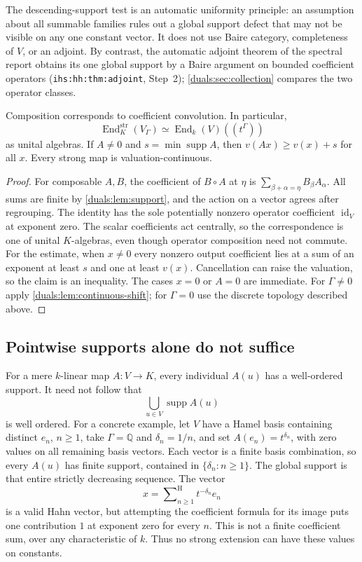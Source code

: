 \documentclass[11pt,letterpaper]{article}
\numberwithin{equation}{section}
\theoremstyle{definition}
\theoremstyle{remark}
\newcommand{\Q}{\mathbb Q}
\newcommand{\supp}{\operatorname{supp}}
\newcommand{\End}{\operatorname{End}}
\newcommand{\sH}{\mathop{\sum}\nolimits^{\mathrm H}}
\newcommand{\ihs}[1]{\texttt{ihs:#1}}
\begin{document}
The descending-support test is an automatic uniformity principle: an
assumption about all summable families rules out a global support defect
that may not be visible on any one constant vector. It does not use
Baire category, completeness of $V$, or an adjoint. By contrast, the
automatic adjoint theorem of the spectral report obtains its one global
support by a Baire argument on bounded coefficient operators
(\ihs{hh:thm:adjoint}, Step~2); \cref{duals:sec:collection} compares the two
operator classes.

\begin{corollary}
\label{duals:cor:strong-calculus}
Composition corresponds to coefficient convolution. In particular,
\[
 \End_K^{\mathrm{str}}(V_\Gamma)
 \simeq \End_k(V)((t^\Gamma))
\]
as unital algebras. If $A\ne0$ and $s=\min\supp A$, then
$v(Ax)\ge v(x)+s$ for all $x$. Every strong map is valuation-continuous.
\end{corollary}
\begin{proof}
For composable $A,B$, the coefficient of $B\circ A$ at $\eta$ is
$\sum_{\beta+\alpha=\eta}B_\beta A_\alpha$. All sums are finite by
\cref{duals:lem:support}, and the action on a vector agrees after regrouping.
The identity has the sole potentially nonzero operator coefficient
$\operatorname{id}_V$ at exponent zero. The scalar coefficients act centrally, so the
correspondence is one of unital $K$-algebras, even though operator
composition need not commute. For the estimate, when $x\ne0$ every
nonzero output coefficient lies at a sum of an exponent at least $s$
and one at least $v(x)$. Cancellation can raise the valuation, so the
claim is an inequality. The cases $x=0$ or $A=0$ are immediate.
For $\Gamma\ne0$ apply \cref{duals:lem:continuous-shift}; for $\Gamma=0$
use the discrete topology described above.
\end{proof}

\subsection{Pointwise supports alone do not suffice}
For a mere $k$-linear map $A:V\to K$, every individual $A(u)$ has a
well-ordered support. It need not follow that
\[
 \bigcup_{u\in V}\supp A(u)
\]
is well ordered. For a concrete example, let $V$ have a Hamel basis containing distinct
$e_n$, $n\ge1$, take $\Gamma=\Q$ and $\delta_n=1/n$, and set
$A(e_n)=t^{\delta_n}$, with zero values on all remaining basis vectors.
Each vector is a finite basis combination, so every $A(u)$ has finite
support, contained in $\{\delta_n:n\ge1\}$. The global support is that
entire strictly decreasing sequence. The vector
\[
 x=\sH_{n\ge1}t^{-\delta_n}e_n
\]
is a valid Hahn vector, but attempting the coefficient formula for its
image puts one contribution $1$ at exponent zero for every $n$.
This is not a finite coefficient sum, over any characteristic of $k$.
Thus no strong extension can have these values on constants.
\end{document}
